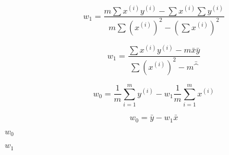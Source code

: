 \documentclass[10pt]{book}
\begin{document}
\begin{mdSnippets}
\begin{mdDisplaySnippet}
\[%
w_1 = \frac{m \sum x^{(i)} y^{(i)} - \sum x^{(i)} \sum y^{(i)}}
  {m \sum (x^{(i)})^2 - (\sum x^{(i)})^2}
\]%
\end{mdDisplaySnippet}%
\begin{mdDisplaySnippet}%
\[%
  w_1 = \frac{\sum x^{(i)} y^{(i)} - m \bar{x}\bar{y}}
  {\sum (x^{(i)})^2 - m \bar^}
\]%
\end{mdDisplaySnippet}%
\begin{mdDisplaySnippet}[6851489da1983751f1011d2478c76d2b]%
\[%
w_0 = \frac{1}{m} \sum_{i=1}^{m} y^{(i)} - w_1 \frac{1}{m}\sum_{i=1}^{m} x^{(i)}
\]%
\end{mdDisplaySnippet}%
\begin{mdDisplaySnippet}%
\[%
  w_0 = \bar{y} - w_1 \bar{x}
\]%
\end{mdDisplaySnippet}%
\begin{mdInlineSnippet}[ac1052c8c41fa0e8d67714e0723a068b]%
$w_0$\end{mdInlineSnippet}%
\begin{mdInlineSnippet}[db007d6a923c2909d42c4292bffca5f0]%
$w_1$\end{mdInlineSnippet}%

\end{mdSnippets}
\end{document}
